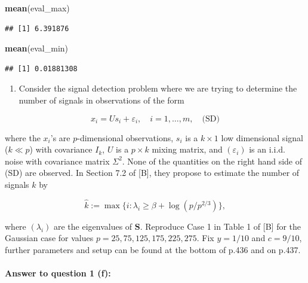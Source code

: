 \documentclass[
]{article}
\newenvironment{Shaded}{\begin{snugshade}}{\end{snugshade}}
\newcommand{\FunctionTok}[1]{\textcolor[rgb]{0.13,0.29,0.53}{\textbf{#1}}}
\newcommand{\NormalTok}[1]{#1}
\providecommand{\tightlist}{%
  \setlength{\itemsep}{0pt}\setlength{\parskip}{0pt}}
\begin{document}
\begin{Shaded}
\begin{Highlighting}[]
\FunctionTok{mean}\NormalTok{(eval\_max)}
\end{Highlighting}
\end{Shaded}

\begin{verbatim}
## [1] 6.391876
\end{verbatim}

\begin{Shaded}
\begin{Highlighting}[]
\FunctionTok{mean}\NormalTok{(eval\_min)}
\end{Highlighting}
\end{Shaded}

\begin{verbatim}
## [1] 0.01881308
\end{verbatim}

\begin{enumerate}
\def\labelenumi{(\alph{enumi})}
\setcounter{enumi}{5}
\tightlist
\item
  Consider the signal detection problem where we are trying to determine
  the number of signals in observations of the form
\end{enumerate}

\[
x_i = Us_i + \varepsilon_i, \quad i = 1, \ldots, m, \quad \text{(SD)}
\]

where the \(x_i\)'s are \(p\)-dimensional observations, \(s_i\) is a
\(k \times 1\) low dimensional signal (\(k \ll p\)) with covariance
\(I_k\), \(U\) is a \(p \times k\) mixing matrix, and
\((\varepsilon_i)\) is an i.i.d. noise with covariance matrix
\(\Sigma^2\). None of the quantities on the right hand side of (SD) are
observed. In Section 7.2 of {[}B{]}, they propose to estimate the number
of signals \(k\) by

\[
\hat{k} := \max\{i : \lambda_i \geq \beta + \log(p/p^{2/3})\},
\]

where \((\lambda_i)\) are the eigenvalues of \(\mathbf{S}\). Reproduce
Case 1 in Table 1 of {[}B{]} for the Gaussian case for values
\(p = 25, 75, 125, 175, 225, 275\). Fix \(y = 1/10\) and \(c = 9/10\),
further parameters and setup can be found at the bottom of p.436 and on
p.437.

\paragraph{\texorpdfstring{\textbf{Answer to question 1
(f)}:}{Answer to question 1 (f):}}\label{answer-to-question-1-f}
\end{document}

